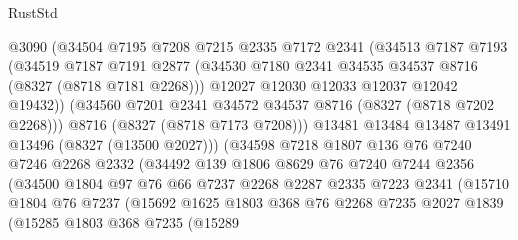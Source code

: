\begin{lexlean}{RustStd}
\begin{coremodule}
{\begin{coremodule}
{{{{{{{{{{{{{{{{{{{{{{{{{{{{{{{{{{{{{{{{{{{{{{{{{{{{{{                      @3090
                      (@34504
                        @7195
                        @7208
                        @7215
                        @2335
                        @7172
                        @2341
                        (@34513
                          @7187
                          @7193
                          (@34519
                            @7187
                            @7191
                            @2877
                            (@34530 @7180 @2341 @34535 @34537 @8716 (@8327 (@8718 @7181 @2268)))
                            @12027
                            @12030
                            @12033
                            @12037
                            @12042
                            @19432))
                        (@34560 @7201 @2341 @34572 @34537 @8716 (@8327 (@8718 @7202 @2268)))
                        @8716
                        (@8327 (@8718 @7173 @7208)))
                      @13481
                      @13484
                      @13487
                      @13491
                      @13496
                      (@8327 (@13500 @2027)))
                    (@34598
                      @7218
                      @1807
                      @136
                      @76
                      @7240
                      @7246
                      @2268
                      @2332
                      (@34492
                        @139
                        @1806
                        @8629
                        @76
                        @7240
                        @7244
                        @2356
                        (@34500
                          @1804
                          @97
                          @76
                          @66
                          @7237
                          @2268
                          @2287
                          @2335
                          @7223
                          @2341
                          (@15710
                            @1804
                            @76
                            @7237
                            (@15692
                              @1625
                              @1803
                              @368
                              @76
                              @2268
                              @7235
                              @2027
                              @1839
                              (@15285
                                @1803
                                @368
                                @7235
                                (@15289
}}}}}}}}}}}}}}}}}}}}}}}}}}}}}}}}}}}}}}}}}}}}}}}}}}}}}}
\end{coremodule}}
\end{coremodule}
\end{lexlean}
